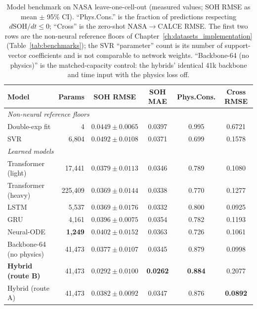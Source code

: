 \begin{table}[H]
\centering
\caption{Model benchmark on NASA leave-one-cell-out (measured values; SOH
RMSE as mean $\pm$ 95\% CI). ``Phys.Cons.'' is the fraction of predictions
respecting $d\mathrm{SOH}/dt\le0$; ``Cross'' is the zero-shot NASA$\rightarrow$CALCE RMSE.
The first two rows are the non-neural reference floors of
Chapter~\ref{ch:datasets_implementation} (Table~\ref{tab:benchmarks}); the
SVR ``parameter'' count is its number of support-vector coefficients and is not
comparable to network weights. ``Backbone-64 (no physics)'' is the
matched-capacity control: the hybrids' identical 41k backbone and time input
with the physics loss off.}
\label{tab:benchmark}
\footnotesize %
\setlength{\tabcolsep}{4.5pt}
\begin{tabular}{l r c c c c}
\toprule
\textbf{Model} & \textbf{Params} & \textbf{SOH RMSE} & \textbf{SOH MAE} & \textbf{Phys.Cons.} & \textbf{Cross RMSE} \\
\midrule
\multicolumn{6}{l}{\emph{Non-neural reference floors}}\\
Double-exp fit     &        4 & $0.0449 \pm 0.0065$ & 0.0397 & 0.995          & 0.6721 \\
SVR                &  6{,}804 & $0.0492 \pm 0.0108$ & 0.0371 & 0.699          & 0.1578 \\
\midrule
\multicolumn{6}{l}{\emph{Learned models}}\\
Transformer (light)  & 17{,}441  & $0.0379 \pm 0.0113$ & 0.0346 & 0.789 & 0.1080 \\
Transformer (heavy) & 225{,}409 & $0.0369 \pm 0.0144$ & 0.0338 & 0.770 & 0.1277 \\
LSTM               &  5{,}537 & $0.0369 \pm 0.0176$ & 0.0332 & 0.800          & 0.0925 \\
GRU                &  4{,}161 & $0.0396 \pm 0.0075$ & 0.0354 & 0.782          & 0.1193 \\
Neural-ODE         &  \textbf{1{,}249} & $0.0402 \pm 0.0152$ & 0.0363 & 0.726 & 0.1061 \\
Backbone-64 (no physics) & 41{,}473 & $0.0377 \pm 0.0107$ & 0.0345 & 0.879   & 0.0998 \\
\textbf{Hybrid (route B)} & 41{,}473 & $\mathbf{0.0292 \pm 0.0100}$ & \textbf{0.0262} & \textbf{0.884} & 0.2077 \\
Hybrid (route A)   & 41{,}473 & $0.0382 \pm 0.0092$ & 0.0347 & 0.876          & \textbf{0.0892} \\
\bottomrule
\end{tabular}
\end{table}

